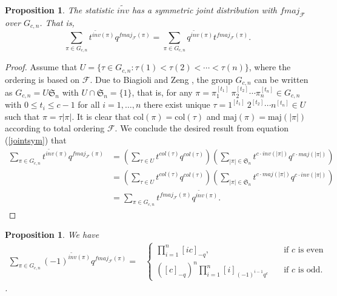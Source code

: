 \documentclass[a4paper,12pt]{article}
\newtheorem{prop}[thm]{Proposition}
\begin{document}
\begin{prop}\label{jdfriends}
The statistic $\widetilde{inv}$ has a symmetric joint distribution with $fmaj_{\mathcal{F}}$ over $G_{c,n}$. That is, 
\begin{equation*}
  \sum_{\pi \in G_{c,n}}t^{\widetilde{inv}(\pi)}q^{fmaj_{\mathcal{F}}(\pi)}=\sum_{\pi \in G_{c,n}}q^{\widetilde{inv}(\pi)}t^{fmaj_{\mathcal{F}}(\pi)}.  
\end{equation*}
\end{prop}
\begin{proof}
Assume that $U=\{\tau \in G_{c,n}:\tau(1)<\tau(2)<\cdots<\tau(n)\}$, where the ordering is based on $\mathcal{F}$. Due to Biagioli and Zeng \cite{biagioli2011}, the group $G_{c,n}$ can be written as $G_{c,n}=U \mathfrak{S}_n$ with $U \cap \mathfrak{S}_n=\{1\}$, that is, for any $\pi=\pi_1^{[t_1]} ~\pi_2^{[t_2]} \cdots  \pi_n^{[t_n]} \in G_{c,n}$ with $0\leq t_i \leq c-1$ for all $i=1,\ldots,n$ there exist unique $\tau=1^{[t_1]} ~2^{[t_2]}\cdots  n^{[t_n]} \in U$ such that $\pi=\tau |\pi|$. It is clear that $\textrm{col}(\pi)=\textrm{col}(\tau)$ and $\textrm{maj}(\pi)=\textrm{maj}(|\pi|)$ according to total ordering $\mathcal{F}$. We conclude the desired result from equation (\ref{jointsym}) that
\begin{align*}
  \sum_{\pi \in G_{c,n}}t^{\widetilde{inv}(\pi)}q^{fmaj_{\mathcal{F}}(\pi)}&=\left(\sum_{\tau \in U}t^{col(\tau)}q^{col(\tau)}\right)\left(\sum_{|\pi| \in \mathfrak{S}_n}t^{c \cdot inv(|\pi|)}q^{c \cdot maj(|\pi|)}\right)  \\
  &=\left(\sum_{\tau \in U}t^{col(\tau)}q^{col(\tau)}\right)\left(\sum_{|\pi| \in \mathfrak{S}_n}t^{c \cdot maj(|\pi|)}q^{c \cdot inv(|\pi|)}\right)  \\ 
  &=\sum_{\pi \in G_{c,n}}t^{fmaj_{\mathcal{F}}(\pi)}q^{\widetilde{inv}(\pi)}.
\end{align*}

\end{proof}

\begin{prop}\label{sgnmhninvtilde}
We have 
\begin{align*}
  \sum_{\pi \in G_{c,n}}(-1)^{\widetilde{inv}(\pi)}q^{fmaj_{\mathcal{F}}(\pi)}=
     &\begin{cases}
       \prod_{i=1}^n [ic]_{-q},&\quad\text{if $c$ is even}\\
      \left([c]_{-q}\right)^n\prod_{i=1}^{n} [i]_{(-1)^{i-1} q^c} &\quad\text{if $c$ is odd.}
     \end{cases}
\end{align*}.  
\end{prop}
\end{document}

